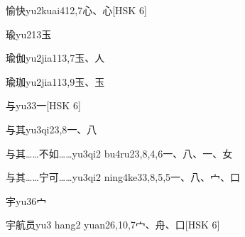 \begin{EntryWithPhonetic}{愉快}{yu2kuai4}{12,7}{⼼、⼼}[HSK 6]
\end{EntryWithPhonetic}

\begin{EntryWithPhonetic}{瑜}{yu2}{13}{⽟}
\end{EntryWithPhonetic}

\begin{EntryWithPhonetic}{瑜伽}{yu2jia1}{13,7}{⽟、⼈}
\end{EntryWithPhonetic}

\begin{EntryWithPhonetic}{瑜珈}{yu2jia1}{13,9}{⽟、⽟}
\end{EntryWithPhonetic}

\begin{EntryWithPhonetic}{与}{yu3}{3}{⼀}[HSK 6]
\end{EntryWithPhonetic}

\begin{EntryWithPhonetic}{与其}{yu3qi2}{3,8}{⼀、⼋}
\end{EntryWithPhonetic}

\begin{EntryWithPhonetic}{与其……不如……}{yu3qi2 bu4ru2}{3,8,4,6}{⼀、⼋、⼀、⼥}
\end{EntryWithPhonetic}

\begin{EntryWithPhonetic}{与其……宁可……}{yu3qi2 ning4ke3}{3,8,5,5}{⼀、⼋、⼧、⼝}
\end{EntryWithPhonetic}

\begin{EntryWithPhonetic}{宇}{yu3}{6}{⼧}
\end{EntryWithPhonetic}

\begin{EntryWithPhonetic}{宇航员}{yu3 hang2 yuan2}{6,10,7}{⼧、⾈、⼝}[HSK 6]
\end{EntryWithPhonetic}

